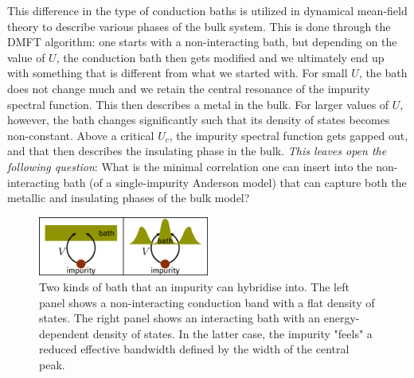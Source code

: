 \documentclass[reprint,superscriptaddress,floatfix]{revtex4-2}
\begin{document}
This difference in the type of conduction baths is utilized in dynamical mean-field theory to describe various phases of the bulk system.
This is done through the DMFT algorithm: one starts with a non-interacting bath, but depending on the value of \(U\), the conduction bath then gets modified and we ultimately end up with something that is different from what we started with.
For small \(U\), the bath does not change much and we retain the central resonance of the impurity spectral function.
This then describes a metal in the bulk.
For larger values of \(U\), however, the bath changes significantly such that its density of states becomes non-constant.
Above a critical \(U_c\), the impurity spectral function gets gapped out, and that then describes the insulating phase in the bulk.
\textit{This leaves open the following question}: What is the minimal correlation one can insert into the non-interacting bath (of a single-impurity Anderson model) that can capture both the metallic and insulating phases of the bulk model?

\begin{figure}[!htb]
\centering
\includegraphics[width=0.5\textwidth]{../figures/dos_diff.pdf}
\caption{Two kinds of bath that an impurity can hybridise into. The left panel shows a non-interacting conduction band with a flat density of states. The right panel shows an interacting bath with an energy-dependent density of states. In the latter case, the impurity "feels" a reduced effective bandwidth defined by the width of the central peak.}
\end{figure}
\end{document}
